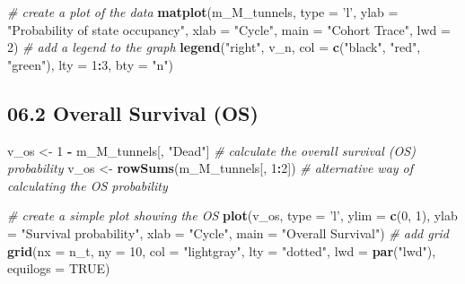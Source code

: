 \documentclass[
]{article}
\newenvironment{Shaded}{\begin{snugshade}}{\end{snugshade}}
\newcommand{\CommentTok}[1]{\textcolor[rgb]{0.56,0.35,0.01}{\textit{#1}}}
\newcommand{\DataTypeTok}[1]{\textcolor[rgb]{0.13,0.29,0.53}{#1}}
\newcommand{\DecValTok}[1]{\textcolor[rgb]{0.00,0.00,0.81}{#1}}
\newcommand{\KeywordTok}[1]{\textcolor[rgb]{0.13,0.29,0.53}{\textbf{#1}}}
\newcommand{\NormalTok}[1]{#1}
\newcommand{\OperatorTok}[1]{\textcolor[rgb]{0.81,0.36,0.00}{\textbf{#1}}}
\newcommand{\OtherTok}[1]{\textcolor[rgb]{0.56,0.35,0.01}{#1}}
\newcommand{\StringTok}[1]{\textcolor[rgb]{0.31,0.60,0.02}{#1}}
\begin{document}
\begin{Shaded}
\begin{Highlighting}[]
\CommentTok{# create a plot of the data}
\KeywordTok{matplot}\NormalTok{(m_M_tunnels, }\DataTypeTok{type =} \StringTok{'l'}\NormalTok{, }
        \DataTypeTok{ylab =} \StringTok{"Probability of state occupancy"}\NormalTok{,}
        \DataTypeTok{xlab =} \StringTok{"Cycle"}\NormalTok{,}
        \DataTypeTok{main =} \StringTok{"Cohort Trace"}\NormalTok{, }\DataTypeTok{lwd =} \DecValTok{2}\NormalTok{)              }
\CommentTok{# add a legend to the graph}
\KeywordTok{legend}\NormalTok{(}\StringTok{"right"}\NormalTok{, v_n, }\DataTypeTok{col =} \KeywordTok{c}\NormalTok{(}\StringTok{"black"}\NormalTok{, }\StringTok{"red"}\NormalTok{, }\StringTok{"green"}\NormalTok{), }\DataTypeTok{lty =} \DecValTok{1}\OperatorTok{:}\DecValTok{3}\NormalTok{, }\DataTypeTok{bty =} \StringTok{"n"}\NormalTok{)  }
\end{Highlighting}
\end{Shaded}

\hypertarget{overall-survival-os}{%
\subsection{06.2 Overall Survival (OS)}\label{overall-survival-os}}

\begin{Shaded}
\begin{Highlighting}[]
\NormalTok{v_os <-}\StringTok{ }\DecValTok{1} \OperatorTok{-}\StringTok{ }\NormalTok{m_M_tunnels[, }\StringTok{"Dead"}\NormalTok{]    }\CommentTok{# calculate the overall survival (OS) probability}
\NormalTok{v_os <-}\StringTok{ }\KeywordTok{rowSums}\NormalTok{(m_M_tunnels[, }\DecValTok{1}\OperatorTok{:}\DecValTok{2}\NormalTok{])  }\CommentTok{# alternative way of calculating the OS probability   }

\CommentTok{# create a simple plot showing the OS}
\KeywordTok{plot}\NormalTok{(v_os, }\DataTypeTok{type =} \StringTok{'l'}\NormalTok{, }
     \DataTypeTok{ylim =} \KeywordTok{c}\NormalTok{(}\DecValTok{0}\NormalTok{, }\DecValTok{1}\NormalTok{),}
     \DataTypeTok{ylab =} \StringTok{"Survival probability"}\NormalTok{,}
     \DataTypeTok{xlab =} \StringTok{"Cycle"}\NormalTok{,}
     \DataTypeTok{main =} \StringTok{"Overall Survival"}\NormalTok{)             }
\CommentTok{# add grid }
\KeywordTok{grid}\NormalTok{(}\DataTypeTok{nx =}\NormalTok{ n_t, }\DataTypeTok{ny =} \DecValTok{10}\NormalTok{, }\DataTypeTok{col =} \StringTok{"lightgray"}\NormalTok{, }\DataTypeTok{lty =} \StringTok{"dotted"}\NormalTok{, }\DataTypeTok{lwd =} \KeywordTok{par}\NormalTok{(}\StringTok{"lwd"}\NormalTok{), }\DataTypeTok{equilogs =} \OtherTok{TRUE}\NormalTok{) }
\end{Highlighting}
\end{Shaded}
\end{document}
